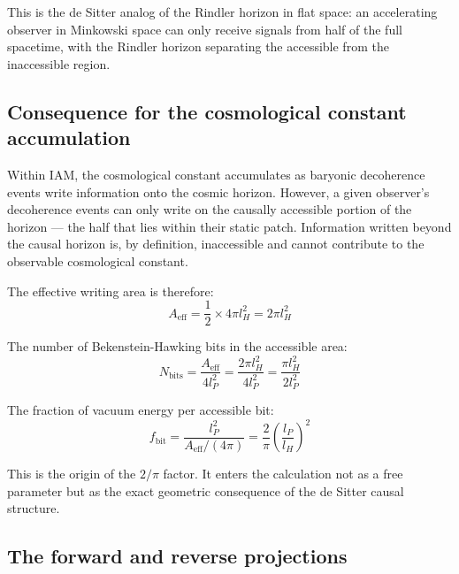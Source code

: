\documentclass[12pt,a4paper]{article}
\begin{document}
This is the de Sitter analog of the Rindler horizon in flat space: an
accelerating observer in Minkowski space can only receive signals from
half of the full spacetime, with the Rindler horizon separating the
accessible from the inaccessible region.

\subsection{Consequence for the cosmological constant accumulation}

Within IAM, the cosmological constant accumulates as baryonic decoherence
events write information onto the cosmic horizon. However, a given
observer's decoherence events can only write on the causally accessible
portion of the horizon — the half that lies within their static patch.
Information written beyond the causal horizon is, by definition,
inaccessible and cannot contribute to the observable cosmological constant.

The effective writing area is therefore:
\begin{equation}
A_\mathrm{eff} = \frac{1}{2} \times 4\pi l_H^2 = 2\pi l_H^2
\label{eq:aeff}
\end{equation}

The number of Bekenstein-Hawking bits in the accessible area:
\begin{equation}
N_\mathrm{bits} = \frac{A_\mathrm{eff}}{4l_P^2} =
\frac{2\pi l_H^2}{4l_P^2} = \frac{\pi l_H^2}{2l_P^2}
\label{eq:nbits}
\end{equation}

The fraction of vacuum energy per accessible bit:
\begin{equation}
f_\mathrm{bit} = \frac{l_P^2}{A_\mathrm{eff}/(4\pi)} =
\frac{2}{\pi}\left(\frac{l_P}{l_H}\right)^2
\label{eq:fbit}
\end{equation}

This is the origin of the $2/\pi$ factor. It enters the calculation not
as a free parameter but as the exact geometric consequence of the de
Sitter causal structure.

\subsection{The forward and reverse projections}
\end{document}
